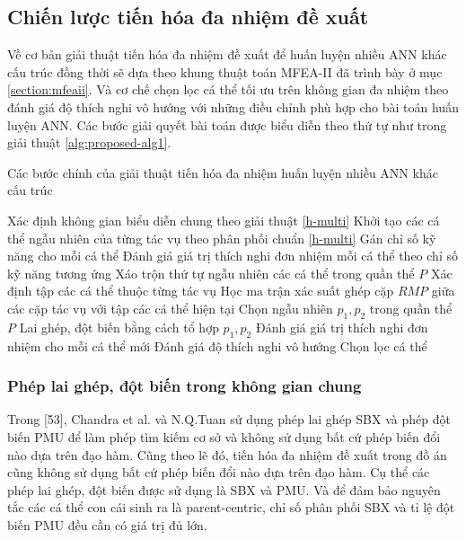 \subsection{Chiến lược tiến hóa đa nhiệm đề xuất}
Về cơ bản giải thuật tiến hóa đa nhiệm đề xuất để huấn luyện nhiều ANN khác cấu trúc đồng thời sẽ dựa theo khung thuật toán MFEA-II đã trình bày ở mục \ref{section:mfeaii}. Và cơ chế chọn lọc cá thể tối ưu trên không gian đa nhiệm theo đánh giá độ thích nghi vô hướng với những điều chỉnh phù hợp cho bài toán huấn luyện ANN. 
Các bước giải quyết bài toán được biểu diễn theo thứ tự như trong giải thuật \ref{alg:proposed-alg1}.
\begin{algorithm} [h!]
    \caption{Các bước chính của giải thuật tiến hóa đa nhiệm huấn luyện nhiều ANN khác cấu trúc}
    \begin{algorithmic}[1]
        \State Xác định không gian biểu diễn chung theo giải thuật \ref{h-multi}
        \State Khởi tạo các cá thể ngẫu nhiên của từng tác vụ theo phân phối chuẩn \ref{h-multi}
        \State Gán chỉ số kỹ năng cho mỗi cá thể
        \State Đánh giá giá trị thích nghi đơn nhiệm mỗi cá thể theo chỉ số kỹ năng tương ứng
            \State Xáo trộn thứ tự ngẫu nhiên các cá thể trong quần thể $P$
            \State Xác định tập các cá thể thuộc từng tác vụ
            \State Học ma trận xác suất ghép cặp $RMP$ giữa các cặp tác vụ với tập các cá thể hiện tại
                \State Chọn ngẫu nhiên $p_1, p_2$ trong quần thể $P$
                \State Lai ghép, đột biến bằng cách tổ hợp $p_1, p_2$
                \State Đánh giá giá trị thích nghi đơn nhiệm cho mỗi cá thể mới
                \State Đánh giá độ thích nghi vô hướng
                \State Chọn lọc cá thể
            \EndFor
        \EndFor
    \end{algorithmic}
    \label{alg:proposed-alg1}
\end{algorithm}

\subsubsection{Phép lai ghép, đột biến trong không gian chung}
Trong [53], Chandra et al. và N.Q.Tuan sử dụng phép lai ghép SBX và phép đột biến PMU để làm phép tìm kiếm cơ sở và không sử dụng bất cứ phép biến đổi nào dựa trên đạo hàm. Cũng theo lẽ đó, tiến hóa đa nhiệm đề xuất trong đồ án cũng không sử dụng bất cứ phép biến đổi nào dựa trên đạo hàm. Cụ thể các phép lai ghép, đột biến được sử dụng là SBX và PMU. Và để đảm bảo nguyên tắc các cá thể con cái sinh ra là parent-centric, chỉ số phân phối SBX và tỉ lệ đột biến PMU đều cần có giá trị đủ lớn. 

